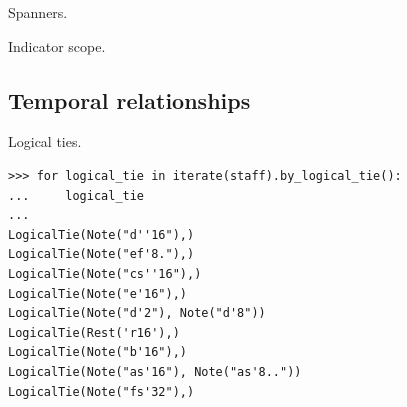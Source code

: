 Spanners.

Indicator scope.

\subsection{Temporal relationships}

Logical ties.

\begin{lstlisting}
>>> for logical_tie in iterate(staff).by_logical_tie():
...     logical_tie
... 
LogicalTie(Note("d''16"),)
LogicalTie(Note("ef'8."),)
LogicalTie(Note("cs''16"),)
LogicalTie(Note("e'16"),)
LogicalTie(Note("d'2"), Note("d'8"))
LogicalTie(Rest('r16'),)
LogicalTie(Note("b'16"),)
LogicalTie(Note("as'16"), Note("as'8.."))
LogicalTie(Note("fs'32"),)
\end{lstlisting}

